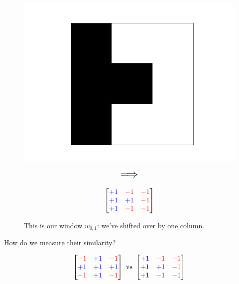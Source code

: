         \begin{figure}[ht]
            \begin{minipage}{.35\textwidth}
              \centering
              \includegraphics[width=.9\linewidth]{images/convolutional_neural_networks_images/window_2d.png} 
            \end{minipage}
            \begin{minipage}{.3\textwidth}
                \centering
                $$\mathlarger{\mathlarger{\mathlarger{\implies}}}$$
            \end{minipage}
            \begin{minipage}{.1\textwidth}
                \centering
              \[
              \begin{bmatrix}
                  \textcolor{blue}{+1} & \textcolor{red}{-1} & \textcolor{red}{-1} \\
                  \textcolor{blue}{+1} & \textcolor{blue}{+1} & \textcolor{red}{-1} \\
                  \textcolor{blue}{+1} & \textcolor{red}{-1} & \textcolor{red}{-1}
              \end{bmatrix}
              \]
            \end{minipage}
            \caption*{This is our window $w_{0,1}$: we've shifted over by one column.}
        \end{figure}

        How do we measure their similarity?

        \begin{equation}
            \begin{bmatrix}
                \textcolor{red}{-1} & \textcolor{blue}{+1} & \textcolor{red}{-1} \\
                \textcolor{blue}{+1} & \textcolor{blue}{+1} & \textcolor{blue}{+1} \\
                \textcolor{red}{-1} & \textcolor{blue}{+1} & \textcolor{red}{-1}
            \end{bmatrix}
            \text{ vs }
            \begin{bmatrix}
                \textcolor{blue}{+1} & \textcolor{red}{-1} & \textcolor{red}{-1} \\
                \textcolor{blue}{+1} & \textcolor{blue}{+1} & \textcolor{red}{-1} \\
                \textcolor{blue}{+1} & \textcolor{red}{-1} & \textcolor{red}{-1}
            \end{bmatrix}
        \end{equation}

